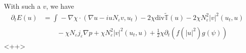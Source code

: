\documentclass[a4paper]{article}
\renewcommand{\div}{\mathrm{div}}
\begin{document}
With such a $v$, we have
\begin{align*}
  \partial_t E(u) &= \int_{}^{} - \nabla \chi \cdot ( \nabla u - i u N_\varepsilon v, u_t ) - 2 \chi \div \tilde{\mathbb{T}}(u) - 2 \chi
  N_\varepsilon^2 |v|^2 (u_t, u) \\
  &\quad \quad - \chi N_\varepsilon j_\varepsilon \nabla p + \chi N_\varepsilon^2 |v|^2 (u_t, u) + \frac{1}{2} \chi \partial_t (f(|u|^2) g(\psi))
\end{align*}<++>
\end{document}

